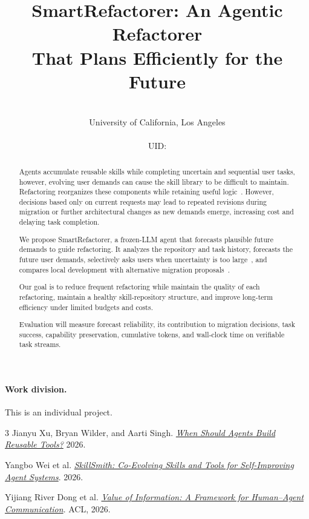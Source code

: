 \documentclass{article}
\title{SmartRefactorer: An Agentic Refactorer\\That Plans Efficiently for the Future}
\author{%
  \AuthorName\\
  University of California, Los Angeles\\
  \texttt{\AuthorEmail}\\
  UID: \AuthorUID
}
\begin{document}
\maketitle

\begin{abstract}
Agents accumulate reusable skills while completing uncertain and sequential user tasks, however, evolving user demands can cause the skill library to be difficult to maintain. Refactoring reorganizes these components while retaining useful logic~\cite{skillsmith}.
However, decisions based only on current requests may lead to repeated revisions during migration or further architectural changes as new demands emerge, increasing cost and delaying task completion.

We propose SmartRefactorer, a frozen-LLM agent that forecasts plausible future demands to guide refactoring. It analyzes the repository and task history, forecasts the future user demands, selectively asks users when uncertainty is too large~\cite{voi}, and compares local development with alternative migration proposals~\cite{dsa}.

Our goal is to reduce frequent refactoring while maintain the quality of each refactoring, maintain a healthy skill-repository structure, and improve long-term efficiency under limited budgets and costs.

Evaluation will measure forecast reliability, its contribution to migration decisions, task success, capability preservation, cumulative tokens, and wall-clock time on verifiable task streams.
\end{abstract}

\paragraph{Work division.}
This is an individual project.

{\small
\begin{thebibliography}{3}
Jianyu Xu, Bryan Wilder, and Aarti Singh.
\href{https://ssrn.com/abstract=7545498}{\emph{When Should Agents Build Reusable Tools?}}
2026.

Yangbo Wei et al.
\href{https://arxiv.org/abs/2606.01314v2}{\emph{SkillSmith: Co-Evolving Skills and Tools for Self-Improving Agent Systems}}.
2026.

Yijiang River Dong et al.
\href{https://aclanthology.org/2026.acl-long.1987/}{\emph{Value of Information: A Framework for Human--Agent Communication}}.
ACL, 2026.
\end{thebibliography}
}
\end{document}
